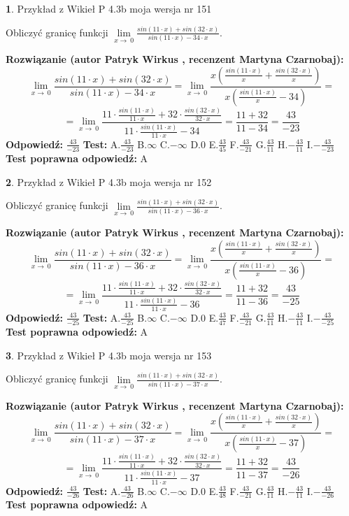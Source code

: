 \documentclass[12pt, a4paper]{article}
\theoremstyle{definition} %
\newtheorem{zad}{}
\newcommand{\zadStart}[1]{\begin{zad}#1\newline}
\newcommand{\zadStop}{\end{zad}}
\newcommand{\rozwStart}[2]{\noindent \textbf{Rozwiązanie (autor #1 , recenzent #2): }\newline}
\newcommand{\rozwStop}{\newline}
\newcommand{\odpStart}{\noindent \textbf{Odpowiedź:}\newline}
\newcommand{\odpStop}{\newline}
\newcommand{\testStart}{\noindent \textbf{Test:}\newline}
\newcommand{\testStop}{\newline}
\newcommand{\kluczStart}{\noindent \textbf{Test poprawna odpowiedź:}\newline}
\newcommand{\kluczStop}{\newline}
\begin{document}
\zadStart{Przykład z Wikieł P 4.3b moja wersja nr 151}


Obliczyć granicę funkcji $\lim\limits_{x\to\ 0}\frac{sin(11 \cdot x)+sin(32 \cdot x)}{sin(11 \cdot x)-34 \cdot x}$.
\zadStop
\rozwStart{Patryk Wirkus}{Martyna Czarnobaj}
$$\lim\limits_{x\to\ 0}\frac{sin(11 \cdot x)+sin(32 \cdot x)}{sin(11 \cdot x)-34 \cdot x}=\lim\limits_{x\to\ 0}\frac{x(\frac{sin(11 \cdot x)}{x}+\frac{sin(32 \cdot x)}{x})}{x(\frac{sin(11 \cdot x)}{x}-34)}=$$
$$=\lim\limits_{x\to\ 0}\frac{11 \cdot \frac{sin(11 \cdot x)}{11 \cdot x}+32 \cdot \frac{sin(32 \cdot x)}{32 \cdot x}}{11 \cdot \frac{sin(11 \cdot x)}{11 \cdot x}-34}=\frac{11+32}{11-34} = \frac{43}{-23}$$
\rozwStop
\odpStart
$\frac{43}{-23}$
\odpStop
\testStart
A.$\frac{43}{-23}$
B.$\infty$
C.$-\infty$
D.$0$
E.$\frac{43}{45}$
F.$\frac{43}{-21}$
G.$\frac{43}{11}$
H.$-\frac{43}{11}$
I.$-\frac{43}{-23}$
\testStop
\kluczStart
A
\kluczStop



\zadStart{Przykład z Wikieł P 4.3b moja wersja nr 152}


Obliczyć granicę funkcji $\lim\limits_{x\to\ 0}\frac{sin(11 \cdot x)+sin(32 \cdot x)}{sin(11 \cdot x)-36 \cdot x}$.
\zadStop
\rozwStart{Patryk Wirkus}{Martyna Czarnobaj}
$$\lim\limits_{x\to\ 0}\frac{sin(11 \cdot x)+sin(32 \cdot x)}{sin(11 \cdot x)-36 \cdot x}=\lim\limits_{x\to\ 0}\frac{x(\frac{sin(11 \cdot x)}{x}+\frac{sin(32 \cdot x)}{x})}{x(\frac{sin(11 \cdot x)}{x}-36)}=$$
$$=\lim\limits_{x\to\ 0}\frac{11 \cdot \frac{sin(11 \cdot x)}{11 \cdot x}+32 \cdot \frac{sin(32 \cdot x)}{32 \cdot x}}{11 \cdot \frac{sin(11 \cdot x)}{11 \cdot x}-36}=\frac{11+32}{11-36} = \frac{43}{-25}$$
\rozwStop
\odpStart
$\frac{43}{-25}$
\odpStop
\testStart
A.$\frac{43}{-25}$
B.$\infty$
C.$-\infty$
D.$0$
E.$\frac{43}{47}$
F.$\frac{43}{-21}$
G.$\frac{43}{11}$
H.$-\frac{43}{11}$
I.$-\frac{43}{-25}$
\testStop
\kluczStart
A
\kluczStop



\zadStart{Przykład z Wikieł P 4.3b moja wersja nr 153}


Obliczyć granicę funkcji $\lim\limits_{x\to\ 0}\frac{sin(11 \cdot x)+sin(32 \cdot x)}{sin(11 \cdot x)-37 \cdot x}$.
\zadStop
\rozwStart{Patryk Wirkus}{Martyna Czarnobaj}
$$\lim\limits_{x\to\ 0}\frac{sin(11 \cdot x)+sin(32 \cdot x)}{sin(11 \cdot x)-37 \cdot x}=\lim\limits_{x\to\ 0}\frac{x(\frac{sin(11 \cdot x)}{x}+\frac{sin(32 \cdot x)}{x})}{x(\frac{sin(11 \cdot x)}{x}-37)}=$$
$$=\lim\limits_{x\to\ 0}\frac{11 \cdot \frac{sin(11 \cdot x)}{11 \cdot x}+32 \cdot \frac{sin(32 \cdot x)}{32 \cdot x}}{11 \cdot \frac{sin(11 \cdot x)}{11 \cdot x}-37}=\frac{11+32}{11-37} = \frac{43}{-26}$$
\rozwStop
\odpStart
$\frac{43}{-26}$
\odpStop
\testStart
A.$\frac{43}{-26}$
B.$\infty$
C.$-\infty$
D.$0$
E.$\frac{43}{48}$
F.$\frac{43}{-21}$
G.$\frac{43}{11}$
H.$-\frac{43}{11}$
I.$-\frac{43}{-26}$
\testStop
\kluczStart
A
\kluczStop
\end{document}
